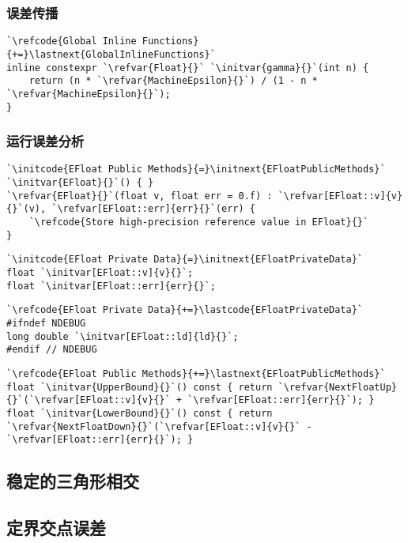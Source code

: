 \subsubsection*{误差传播}
\begin{lstlisting}
`\refcode{Global Inline Functions}{+=}\lastnext{GlobalInlineFunctions}`
inline constexpr `\refvar{Float}{}` `\initvar{gamma}{}`(int n) {
    return (n * `\refvar{MachineEpsilon}{}`) / (1 - n * `\refvar{MachineEpsilon}{}`);
}
\end{lstlisting}

\subsubsection*{运行误差分析}
\begin{lstlisting}
`\initcode{EFloat Public Methods}{=}\initnext{EFloatPublicMethods}`
`\initvar{EFloat}{}`() { }
`\refvar{EFloat}{}`(float v, float err = 0.f) : `\refvar[EFloat::v]{v}{}`(v), `\refvar[EFloat::err]{err}{}`(err) {
    `\refcode{Store high-precision reference value in EFloat}{}`
}
\end{lstlisting}

\begin{lstlisting}
`\initcode{EFloat Private Data}{=}\initnext{EFloatPrivateData}`
float `\initvar[EFloat::v]{v}{}`;
float `\initvar[EFloat::err]{err}{}`;
\end{lstlisting}

\begin{lstlisting}
`\refcode{EFloat Private Data}{+=}\lastcode{EFloatPrivateData}`
#ifndef NDEBUG
long double `\initvar[EFloat::ld]{ld}{}`;
#endif // NDEBUG
\end{lstlisting}

\begin{lstlisting}
`\refcode{EFloat Public Methods}{+=}\lastnext{EFloatPublicMethods}`
float `\initvar{UpperBound}{}`() const { return `\refvar{NextFloatUp}{}`(`\refvar[EFloat::v]{v}{}` + `\refvar[EFloat::err]{err}{}`); }
float `\initvar{LowerBound}{}`() const { return `\refvar{NextFloatDown}{}`(`\refvar[EFloat::v]{v}{}` - `\refvar[EFloat::err]{err}{}`); }
\end{lstlisting}

\subsection{稳定的三角形相交}\label{sub:稳定的三角形相交}

\subsection{定界交点误差}\label{sub:定界交点误差}